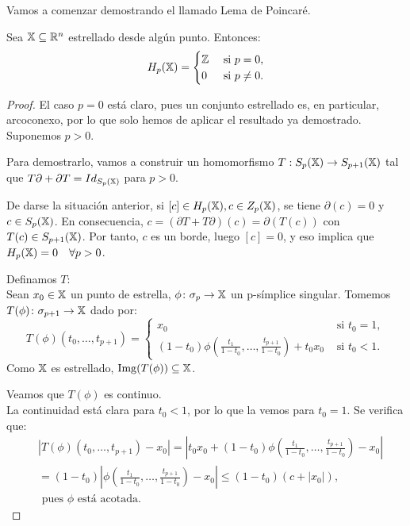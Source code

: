 Vamos a comenzar demostrando el llamado Lema de Poincaré.

\begin{lemma}
  Sea ${\mathbb X} \subseteq \mathbb{R}^n$ estrellado desde algún punto. Entonces:
  \[ H_p({\mathbb X}) = \begin{cases}  \mathbb{Z} & \text{ si } p = 0, \\
                              0  & \text{ si } p \neq 0.
                            \end{cases} \]
\end{lemma}

\begin{proof}
  El caso $p = 0$ está claro, pues un conjunto estrellado es, en particular, arcoconexo, por lo que solo hemos de aplicar el resultado ya demostrado.
  Suponemos $p > 0$.

  Para demostrarlo, vamos a construir un homomorfismo $ T: S_{p}({\mathbb X}) \to S_{p+1}({\mathbb X})$ tal que $ T \partial + \partial  T = Id_{S_{p}({\mathbb X})}$ para $p > 0$.

  De darse la situación anterior, si $[c] \in H_p({\mathbb X}), c \in Z_p({\mathbb X})$, se tiene $\partial(c) = 0$ y $c \in S_p({\mathbb X})$.
  En consecuencia, $c = (\partial  T +  T \partial)(c)  = \partial( T(c))$ con $ T(c) \in S_{p+1}({\mathbb X})$.
  Por tanto, $c$ es un borde, luego $[c] = 0$, y eso implica que $H_p({\mathbb X}) = 0 \quad \forall p > 0$.

  Definamos $T$: \\
  Sean $x_0 \in {\mathbb X}$ un punto de estrella, $\phi \colon \sigma_p \to {\mathbb X}$ un p-símplice singular. Tomemos $T(\phi) \colon \sigma_{p+1} \to {\mathbb X}$ dado por:
  \[ T(\phi)(t_0,\dots,t_{p+1}) = \begin{cases} x_0 & \text{ si } t_0 = 1, \\
                                                (1-t_0)\phi(\frac{t_1}{1-t_0},\dots,\frac{t_{p+1}}{1-t_0}) + t_0 x_0 & \text{ si } t_0 < 1.
                                  \end{cases} \]
  Como ${\mathbb X}$ es estrellado, $\operatorname{Img}(T(\phi)) \subseteq {\mathbb X}$.

  Veamos que $T(\phi)$ es continuo. \\
  La continuidad está clara para $t_0 < 1$, por lo que la vemos para $t_0 = 1$. Se verifica que:
  \begin{align*}
    &|T(\phi)(t_0,\dots,t_{p+1}) - x_0| = |t_0 x_0 + (1-t_0)\phi(\frac{t_1}{1-t_0},\dots,\frac{t_{p+1}}{1-t_0}) - x_0| \\
    &= (1-t_0)|\phi(\frac{t_1}{1-t_0},\dots,\frac{t_{p+1}}{1-t_0}) - x_0| \leq (1-t_0)(c + |x_0|), \\
    & \text{ pues $\phi$ está acotada.}
  \end{align*}


\end{proof}
